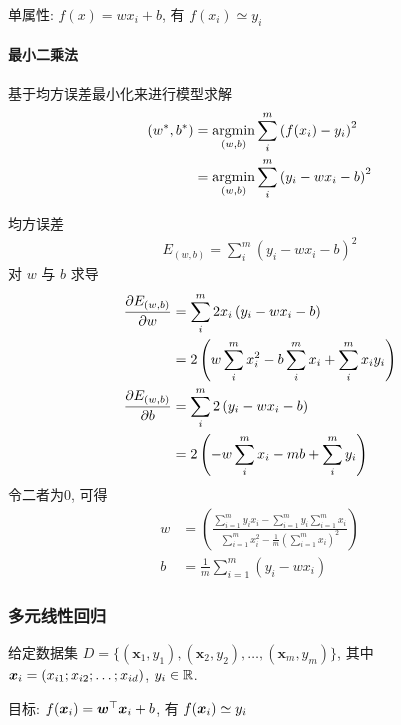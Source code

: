 单属性: $f(x)=wx_i+b$, 有 $f(x_i)\simeq y_i$

\paragraph{最小二乘法}
基于均方误差最小化来进行模型求解
\begin{align*}
    (w^*, b^*)&=\operatorname*{argmin}_{(w,b)} \sum_i^m \left( f(x_i)-y_i \right)^2\\
    &=\operatorname*{argmin}_{(w,b)} \sum_i^m \left( y_i - wx_i -b \right)^2
\end{align*}

均方误差
\begin{align*}
    E_{(w,b)}= \sum_i^m \left( y_i - wx_i -b \right)^2
\end{align*}
对 $w$ 与 $b$ 求导
\begin{align*}
    \frac{\partial E_{(w,b)}}{\partial w}&=\sum_i^m 2x_i\left( y_i - wx_i -b \right)\\
    &=2\left( w\sum_i^m x_i^2 -b \sum_i^m x_i + \sum_i^m x_iy_i \right)\\
    \frac{\partial E_{(w,b)}}{\partial b}&=\sum_i^m 2\left( y_i - wx_i -b \right)\\
    &=2\left( -w\sum_i^m x_i - mb + \sum_i^m y_i \right)
\end{align*}
令二者为0, 可得
\begin{align*}
    w&=\left( \frac{\displaystyle \sum_{i=1}^m y_ix_i- \sum_{i=1}^m y_i\sum_{i=1}^mx_i}{\displaystyle \sum_{i=1}^m x_i^2 -\frac{1}{m}\left( \sum_{i=1}^m x_i \right)^2} \right)\\
    b&=\frac{1}{m}\sum_{i=1}^m(y_i-wx_i)
\end{align*}

\subsubsection{多元线性回归}
给定数据集 $D=\{ (\bm x_1, y_1), (\bm x_2, y_2), \dots, (\bm x_m, y_m)  \}$, 其中 $\bm{x}_i=(x_{i1};x_{i2};\dots;x_{id})$, $y_i\in\mathbb{R}$. 

目标: $f(\bm{x}_i)=\bm {w}^\top \bm{x}_i +b$, 有 $f(\bm{x}_i)\simeq y_i$

